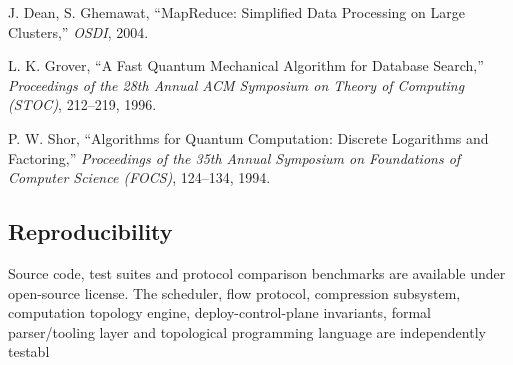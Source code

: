 \documentclass[
]{article}
\begin{document}
J. Dean, S. Ghemawat, ``MapReduce: Simplified Data Processing on Large
Clusters,'' \emph{OSDI}, 2004.

L. K. Grover, ``A Fast Quantum Mechanical Algorithm for Database
Search,'' \emph{Proceedings of the 28th Annual ACM Symposium on Theory
of Computing (STOC)}, 212--219, 1996.

P. W. Shor, ``Algorithms for Quantum Computation: Discrete Logarithms
and Factoring,'' \emph{Proceedings of the 35th Annual Symposium on
Foundations of Computer Science (FOCS)}, 124--134, 1994.

\subsection{\texorpdfstring{\textbf{Reproducibility}}{Reproducibility}}\label{reproducibility}

Source code, test suites and protocol comparison benchmarks are
available under open-source license. The scheduler, flow protocol,
compression subsystem, computation topology engine, deploy-control-plane
invariants, formal parser/tooling layer and topological programming
language are independently testabl
\end{document}
